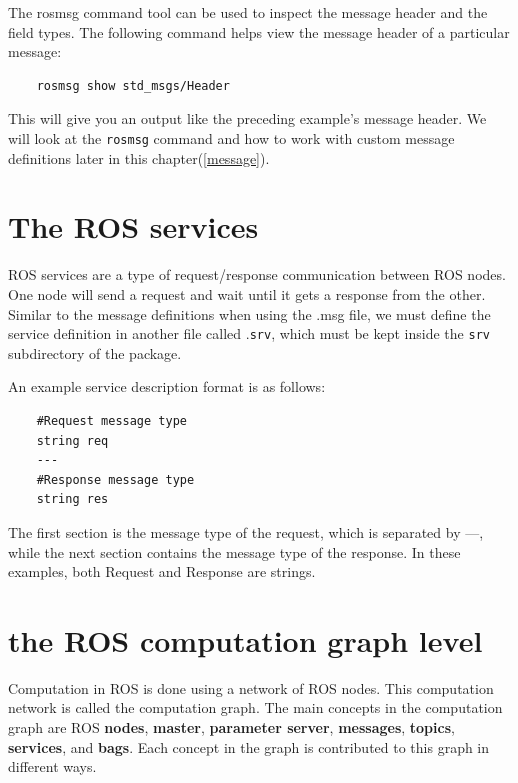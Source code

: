 \documentclass[../../main]{subfiles}
\begin{document}
The rosmsg command tool can be used to inspect the message header and the field types.
The following command helps view the message header of a particular message:
\begin{verbatim}
    rosmsg show std_msgs/Header
\end{verbatim}
This will give you an output like the preceding example's message header. We will look
at the \texttt{rosmsg} command and how to work with custom message definitions later in this
chapter(\cref{message}).
\newpage
\section{The ROS services}
ROS services are a type of request/response communication between ROS nodes. One node will send a request and wait until it gets a response from the other. Similar to the message definitions when using the .msg file, we must define the service definition in another file called .\texttt{srv}, which must be kept inside the \texttt{srv} subdirectory of the package.

An example service description format is as follows:
\begin{verbatim}
    #Request message type
    string req
    ---
    #Response message type
    string res
\end{verbatim}
The first section is the message type of the request, which is separated by ---, while the
next section contains the message type of the response. In these examples, both Request
and Response are strings.
\section{the ROS computation graph level}
Computation in ROS is done using a network of ROS nodes. This computation network is called the computation graph. The main concepts in the computation graph are ROS \textbf{nodes}, \textbf{master}, \textbf{parameter server}, \textbf{messages}, \textbf{topics}, \textbf{services}, and \textbf{bags}. Each concept in the graph is contributed to this graph in different ways.
\end{document}
